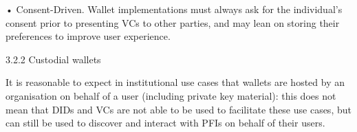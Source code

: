 \documentclass[
]{article}
\begin{document}
• Consent-Driven. Wallet implementations must always ask for the
individual's consent prior to presenting VCs to other parties, and may
lean on storing their preferences to improve user experience.

3.2.2 Custodial wallets

It is reasonable to expect in institutional use cases that wallets are
hosted by an organisation on behalf of a user (including private key
material): this does not mean that DIDs and VCs are not able to be used
to facilitate these use cases, but can still be used to discover and
interact with PFIs on behalf of their users.
\end{document}
